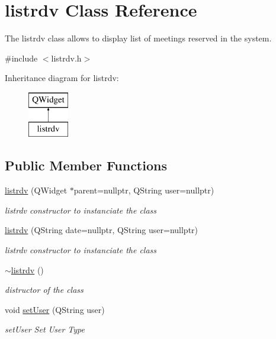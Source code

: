 \hypertarget{classlistrdv}{}\section{listrdv Class Reference}
\label{classlistrdv}


The listrdv class allows to display list of meetings reserved in the system.  




{\ttfamily \#include $<$listrdv.\+h$>$}

Inheritance diagram for listrdv\+:\begin{figure}[H]
\begin{center}
\leavevmode
\includegraphics[height=2.000000cm]{classlistrdv}
\end{center}
\end{figure}
\subsection*{Public Member Functions}
\begin{DoxyCompactItemize}
\item 
\mbox{\hyperlink{classlistrdv_a90053e4d9e434e65d2ddd6c654ecbe7b}{listrdv}} (Q\+Widget $\ast$parent=nullptr, Q\+String user=nullptr)
\begin{DoxyCompactList}\small\item\em listrdv constructor to instanciate the class \end{DoxyCompactList}\item 
\mbox{\hyperlink{classlistrdv_aec2ba2f32006ecb1901a8fc1d947ea6f}{listrdv}} (Q\+String date=nullptr, Q\+String user=nullptr)
\begin{DoxyCompactList}\small\item\em listrdv constructor to instanciate the class \end{DoxyCompactList}\item 
\mbox{\label{classlistrdv_a18fe2f46c6b8a0dcbfbd697cc4d135f6}} 
\mbox{\hyperlink{classlistrdv_a18fe2f46c6b8a0dcbfbd697cc4d135f6}{$\sim$listrdv}} ()
\begin{DoxyCompactList}\small\item\em distructor of the class \end{DoxyCompactList}\item 
void \mbox{\hyperlink{classlistrdv_aab827307c6c63d5a6c1d5e8cbfbb0d72}{set\+User}} (Q\+String user)
\begin{DoxyCompactList}\small\item\em set\+User Set User Type \end{DoxyCompactList}\end{DoxyCompactItemize}


